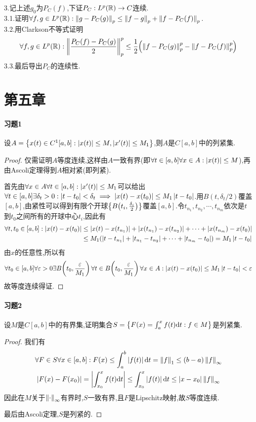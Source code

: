 \documentclass[UTF8]{article}
\newcommand{\parablue}[1]{\paragraph*{\textcolor{blue}{#1}}}
\begin{document}
3.记上述$g_0$为$P_C(f)$,下证$P_C:L^p(\mathbb{R})\to C$连续.\\
3.1.证明$\forall f,g\in L^p(\mathbb{R}):\left\|g-P_C(g)\right\|_p\leq \left\|f-g\right\|_p+\left\|f-P_C(f)\right\|_p$.\\
3.2.用Clarkson不等式证明$$\forall f,g\in L^p(\mathbb{R}):\left\|\frac{P_C(f)-P_C(g)}{2}\right\|^p_p\leq \frac{1}{2}\!\left(\left\|f-P_C(g)\right\|^p_p-\left\|f-P_C(f)\right\|^p_p\right)$$
3.3.最后导出$P_C$的连续性.


\newpage
\addtocounter{section}{1}
\section{第五章}
\paragraph*{习题1}设$A=\left\{x(t)\in C^1[a,b]:\left|x(t)\right|\leq M, \left|x'(t)\right|\leq M_1\right\}$,则$A$是$C[a,b]$中的列紧集.
\begin{proof}
    仅需证明$A$等度连续,这样由$A$一致有界(即$\forall t\in [a,b]\forall x\in A: \left|x(t)\right|\leq M$),再由Ascoli定理得到$A$相对紧(即列紧).

    首先由$\forall x\in A\forall t\in [a,b]:\left|x'(t)\right|\leq M_1$可以给出$\forall t\in [a,b]\exists \delta_t>0:\left|t-t_0\right|<\delta_t\implies \left|x(t)-x(t_0)\right|\leq M_1\left|t-t_0\right|$.用$B(t,\delta_t/2)$覆盖$[a,b]$,由紧性可以得到有限个开球$\left\{B\!\left(t_i,\frac{\delta_i}{2}\right)\right\}$覆盖$[a,b]$.令$t_{n_1},t_{n_2},\cdots,t_{n_m}$依次是$t$到$t_0$之间所有的开球中心$t_i$,因此有$$\begin{aligned}
        \forall t,t_0\in [a,b]:\left|x(t)-x(t_0)\right|&\leq \left|x(t)-x(t_{n_1})\right|+\left|x(t_{n_1})-x(t_{n_2})\right|+\cdots+\left|x(t_{n_m})-x(t_0)\right|\\
        &\leq M_1(\left|t-t_{n_1}\right|+\left|t_{n_1}-t_{n_2}\right|+\cdots+\left|t_{n_m}-t_0\right|)=M_1\left|t-t_0\right|
    \end{aligned}$$
    由$x$的任意性,所以有$$\forall t_0\in [a,b]\forall \varepsilon>0\exists B\!\left(t_0,\frac{\varepsilon}{M_1}\right)\forall t\in B\!\left(t_0,\frac{\varepsilon}{M_1}\right)\forall x\in A:\left|x(t)-x(t_0)\right|\leq M_1\left|t-t_0\right|<\varepsilon$$
    故等度连续得证.
\end{proof}

\paragraph*{习题2}设$M$是$C[a,b]$中的有界集,证明集合$S=\left\{F(x)=\int_a^x f(t)\mathrm{d} t:f\in M\right\}$是列紧集.
\begin{proof}
    我们有$$\begin{gathered}
        \forall F\in S\forall x\in [a,b]:F(x)\leq \int_a^b\left|f(t)\right|\mathrm{d} t=\left\|f\right\|_1\leq (b-a)\left\|f\right\|_\infty\\
        \left|F(x)-F(x_0)\right|=\left|\int_{x_0}^x f(t)\mathrm{d} t\right|\leq \int_{x_0}^x\left|f(t)\right|\mathrm{d} t\leq \left|x-x_0\right|\left\|f\right\|_\infty
    \end{gathered}$$
    因此在$M$关于$\left\|\cdot\right\|_\infty$有界时,$S$一致有界,且$F$是Lipschitz映射,故$S$等度连续.

    最后由Ascoli定理,$S$是列紧的.
\end{proof}
\end{document}
